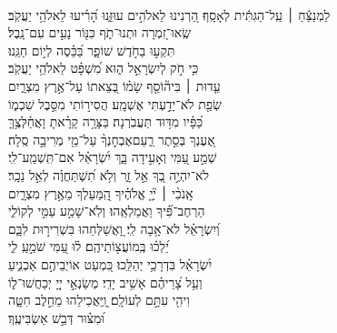 \documentclass[twoside, openany, parskip=half, 11pt]{book}
\begin{document}
\\
\vspace{-1.5\baselineskip}
\begin{narrow}
%
לַמְנַצֵּ֬חַ ׀ עַֽל־הַגִּתִּ֬ית לְאָסָֽף׃ \hfill \break
 הַ֭רְנִינוּ לֵאלֹהִ֣ים עוּזֵּ֑נוּ \hfill הָ֝רִ֗יעוּ לֵאלֹהֵ֥י יַעֲקֹֽב׃ \\
 שְֽׂאוּ־זִ֭מְרָה וּתְנוּ־תֹ֑ף \hfill כִּנּ֖וֹר נָעִ֣ים עִם־נָֽבֶל׃ \\
 תִּקְע֣וּ בַחֹ֣דֶשׁ שׁוֹפָ֑ר \hfill בַּ֝כֵּ֗סֶה לְי֣וֹם חַגֵּֽנוּ׃ \\
 כִּ֤י חֹ֣ק לְיִשְׂרָאֵ֣ל ה֑וּא \hfill מִ֝שְׁפָּ֗ט לֵאלֹהֵ֥י יַעֲקֹֽב׃ \\
 עֵ֤דוּת ׀ בִּיה֘וֹסֵ֤ף שָׂמ֗וֹ \hfill בְּ֭צֵאתוֹ עַל־אֶ֣רֶץ מִצְרָ֑יִם \\ שְׂפַ֖ת לֹא־יָדַ֣עְתִּי אֶשְׁמָֽע׃ \hfill 
 הֲסִיר֣וֹתִי מִסֵּ֣בֶל שִׁכְמ֑וֹ \\ כַּ֝פָּ֗יו מִדּ֥וּד תַּעֲבֹֽרְנָה׃ \hfill 
 בַּצָּרָ֥ה קָרָ֗אתָ וָאֲחַ֫לְּצֶ֥ךָּ \\ אֶ֭עֶנְךָ בְּסֵ֣תֶר רַ֑עַם\hfill  אֶבְחׇנְךָ֨ עַל־מֵ֖י מְרִיבָ֣ה סֶֽלָה׃ \\
 שְׁמַ֣ע עַ֭מִּי וְאָעִ֣ידָה בָּ֑ךְ \hfill יִ֝שְׂרָאֵ֗ל אִם־תִּֽשְׁמַֽע־לִֽי׃ \\
 לֹא־יִהְיֶ֣ה בְ֭ךָ אֵ֣ל זָ֑ר \hfill וְלֹ֥א תִ֝שְׁתַּחֲוֶ֗ה לְאֵ֣ל נֵכָֽר׃ \\
 אָֽנֹכִ֨י ׀ יְ֘יָ֤ אֱלֹהֶ֗יךָ \hfill הַֽ֭מַּעַלְךָ מֵאֶ֣רֶץ מִצְרָ֑יִם \\ הַרְחֶב־פִּ֗֝יךָ וַאֲמַלְאֵֽהוּ׃ \hfill 
 וְלֹֽא־שָׁמַ֣ע עַמִּ֣י לְקוֹלִ֑י \\ וְ֝יִשְׂרָאֵ֗ל לֹא־אָ֥בָה לִֽי׃ \hfill 
 וָ֭אֲשַׁלְּחֵהוּ בִּשְׁרִיר֣וּת לִבָּ֑ם \\ יֵ֝לְכ֗וּ בְּֽמוֹעֲצ֖וֹתֵיהֶֽם׃ \hfill 
 ל֗וּ עַ֭מִּי שֹׁמֵ֣עַֽ לִ֑י \\ יִ֝שְׂרָאֵ֗ל בִּדְרָכַ֥י יְהַלֵּֽכוּ׃ \hfill 
 כִּ֭מְעַט אוֹיְבֵיהֶ֣ם אַכְנִ֑יעַ \\ וְעַ֥ל צָ֝רֵיהֶ֗ם אָשִׁ֥יב יָדִֽי׃ \hfill 
 מְשַׂנְאֵ֣י יְיָ֭ יְכַחֲשׁוּ־ל֑וֹ \\ וִיהִ֖י עִתָּ֣ם לְעוֹלָֽם׃ \hfill 
 וַֽ֭יַּאֲכִילֵהוּ מֵחֵ֣לֶב חִטָּ֑ה \\ וּ֝מִצּ֗וּר דְּבַ֣שׁ אַשְׂבִּיעֶֽךָ׃ \hfill \break
\end{narrow}
\end{document}
